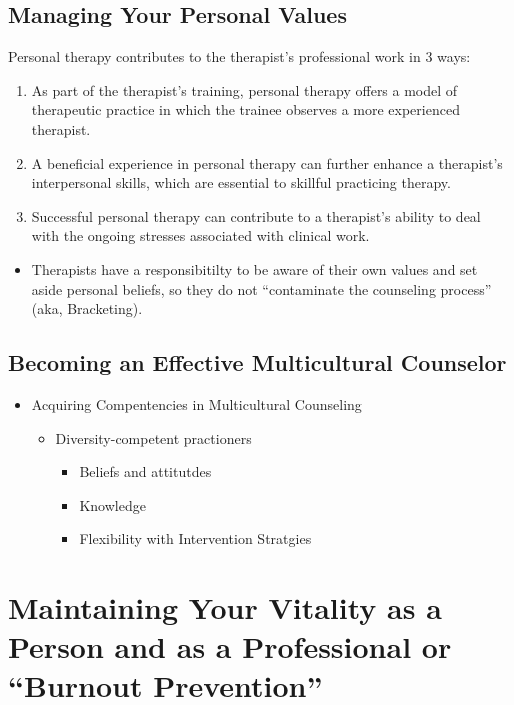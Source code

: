 \subsection{Managing Your Personal Values}

Personal therapy contributes to the therapist's professional work in 3 ways:

\begin{enumerate}
    \item As part of the therapist's training, personal therapy offers a model of therapeutic practice in which the trainee observes a more experienced therapist.
    \item A beneficial experience in personal therapy can further enhance a therapist's interpersonal skills, which are essential to skillful practicing therapy.
    \item Successful personal therapy can contribute to a therapist's ability to deal with the ongoing stresses associated with clinical work.
\end{enumerate}

\begin{itemize}
    \item Therapists have a responsibitilty to be aware of their own values and set aside personal beliefs, so they do not ``contaminate the counseling process'' (aka, Bracketing). 
\end{itemize}

\subsection{Becoming an Effective Multicultural Counselor} 

\begin{itemize}
    \item Acquiring Compentencies in Multicultural Counseling
    \begin{itemize}
        \item Diversity-competent practioners
        \begin{itemize}
            \item Beliefs and attitutdes
            \item Knowledge
            \item Flexibility with Intervention Stratgies
        \end{itemize}
    \end{itemize}
\end{itemize}

\section{Maintaining Your Vitality as a Person and as a Professional or ``Burnout Prevention''}

